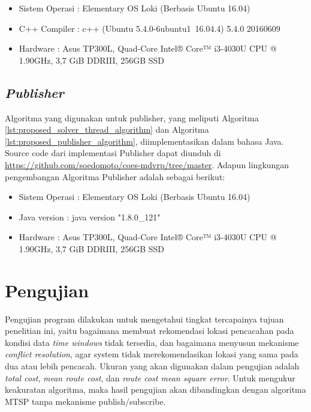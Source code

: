 \begin{itemize}
\item Sistem Operasi		: Elementary OS Loki (Berbasis Ubuntu 16.04)
\item C++ Compiler			: c++ (Ubuntu 5.4.0-6ubuntu1~16.04.4) 5.4.0 20160609
\item Hardware				: Asus TP300L, Quad-Core Intel® Core™ i3-4030U CPU @ 1.90GHz, 3,7 GiB DDRIII, 256GB SSD
\end{itemize}


\subsection{\textit{Publisher}}
Algoritma yang digunakan untuk publisher, yang meliputi Algoritma \ref{lst:proposed_solver_thread_algorithm} dan Algoritma \ref{lst:proposed_publisher_algorithm}, diimplementasikan dalam bahasa Java. Source code dari implementasi Publisher dapat diunduh di \url{https://github.com/soedomoto/coes-mdvrp/tree/master}. Adapun lingkungan pengembangan Algoritma Publisher adalah sebagai berikut:


\begin{itemize}
\item Sistem Operasi		: Elementary OS Loki (Berbasis Ubuntu 16.04)
\item Java version			: java version "1.8.0\_121"
\item Hardware				: Asus TP300L, Quad-Core Intel® Core™ i3-4030U CPU @ 1.90GHz, 3,7 GiB DDRIII, 256GB SSD
\end{itemize}


\section{Pengujian}
\label{sec:testing}
Pengujian program dilakukan untuk mengetahui tingkat tercapainya tujuan penelitian ini, yaitu bagaimana membuat rekomendasi lokasi pencacahan pada kondisi data \textit{time windows} tidak tersedia, dan bagaimana menyusun mekanisme \textit{conflict resolution}, agar system tidak merekomendasikan lokasi yang sama pada dua atau lebih pencacah. Ukuran yang akan digunakan dalam pengujian adalah \textit{total cost}, \textit{mean route cost}, dan \textit{route cost mean square error}. Untuk mengukur keakuratan algoritma, maka hasil pengujian akan dibandingkan dengan algoritma MTSP tanpa mekanisme publish/subscribe.



